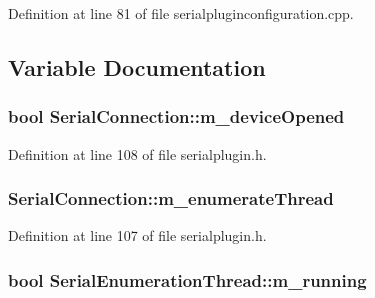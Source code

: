 Definition at line 81 of file serialpluginconfiguration.\-cpp.



\subsection{Variable Documentation}
\hypertarget{group___serial_plugin_gac430f3139892f313e094560f5e2e72d1}{
\subsubsection[{m\-\_\-device\-Opened}]{\setlength{\rightskip}{0pt plus 5cm}bool Serial\-Connection\-::m\-\_\-device\-Opened\hspace{0.3cm}{\ttfamily [protected]}}}\label{group___serial_plugin_gac430f3139892f313e094560f5e2e72d1}


Definition at line 108 of file serialplugin.\-h.

\hypertarget{group___serial_plugin_ga5895d83033636cc3832bd9478f4415f7}{
\subsubsection[{m\-\_\-enumerate\-Thread}]{ Serial\-Connection\-::m\-\_\-enumerate\-Thread\hspace{0.3cm}{\ttfamily [protected]}}}\label{group___serial_plugin_ga5895d83033636cc3832bd9478f4415f7}


Definition at line 107 of file serialplugin.\-h.

\hypertarget{group___serial_plugin_ga1b3398189b91a1994544370f00f8cd00}{
\subsubsection[{m\-\_\-running}]{\setlength{\rightskip}{0pt plus 5cm}bool Serial\-Enumeration\-Thread\-::m\-\_\-running\hspace{0.3cm}{\ttfamily [protected]}}}\label{group___serial_plugin_ga1b3398189b91a1994544370f00f8cd00}


